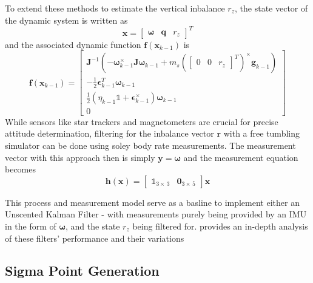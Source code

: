 To extend these methods to estimate the vertical inbalance $r_z$, the state vector of the dynamic system is written as 
\begin{equation}
    \bm{x} = \begin{bmatrix} \bm{\omega} & \bm{q} & r_z \end{bmatrix}^T
\end{equation}
and the associated dynamic function $\bm{f}(\bm{x}_{k-1})$ is
\begin{equation}
    \bm{f}(\bm{x}_{k-1}) = \begin{bmatrix}
        \bm{J}^{-1}(-\bm{\omega}_{k-1}^\times \bm{J\omega}_{k-1} + m_s
        (\begin{bmatrix}
            0 & 0 & r_z
        \end{bmatrix}^T)^{\times}\bm{g}_{k-1})
        \\
        -\frac{1}{2}\bm{\epsilon}_{k-1}^T\bm{\omega}_{k-1} 
        \\
        \frac{1}{2}(\eta_{k-1}\mathbb{1} + \bm{\epsilon}_{k-1}^{\times})\bm{\omega}_{k-1}
        \\
        0
    \end{bmatrix}
\end{equation}
 While sensors like star trackers and magnetometers are crucial for precise attitude determination, filtering for the inbalance vector $\bm{r}$ with a free tumbling simulator can be done using soley body rate measurements. The measurement vector with this approach then is simply $\bm{y}=\bm{\omega}$ and the measurement equation becomes
\begin{equation}
    \bm{h}(\bm{x})= \begin{bmatrix}
        \mathbb{1}_{3\times\,3} & \bm{0}_{3\times\,5}
    \end{bmatrix}\bm{x}
\end{equation}

This process and measurement model serve as a basline to implement either an Unscented Kalman Filter - with measurements purely being provided by an IMU in the form of $\bm{\omega}$, and the state $r_z$ being filtered for. \cite{silva_filtering_2018} provides an in-depth analysis of these filters' performance and their variations

\subsection*{Sigma Point Generation}

